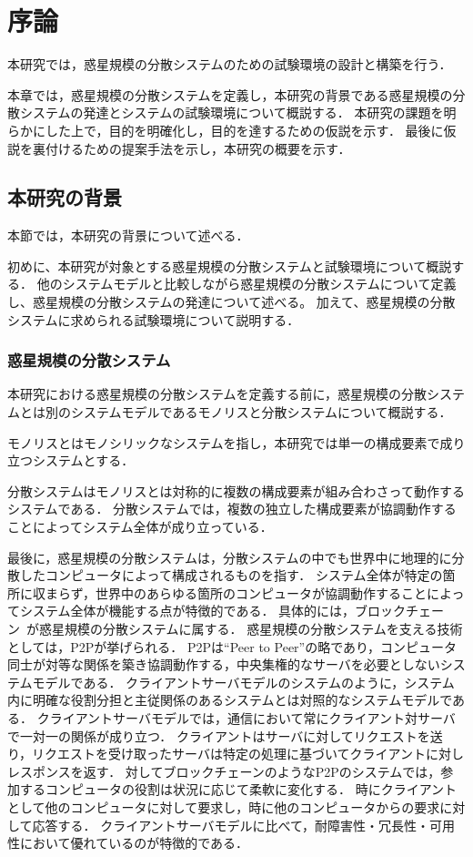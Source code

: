 \chapter{序論}
\label{introduction}

本研究では，惑星規模の分散システムのための試験環境の設計と構築を行う．

本章では，惑星規模の分散システムを定義し，本研究の背景である惑星規模の分散システムの発達とシステムの試験環境について概説する．
本研究の課題を明らかにした上で，目的を明確化し，目的を達するための仮説を示す．
最後に仮説を裏付けるための提案手法を示し，本研究の概要を示す．

\section{本研究の背景}
\label{introduction:background}

本節では，本研究の背景について述べる．

初めに、本研究が対象とする惑星規模の分散システムと試験環境について概説する．
他のシステムモデルと比較しながら惑星規模の分散システムについて定義し、惑星規模の分散システムの発達について述べる。
加えて、惑星規模の分散システムに求められる試験環境について説明する．

\subsection{惑星規模の分散システム}

本研究における惑星規模の分散システムを定義する前に，惑星規模の分散システムとは別のシステムモデルであるモノリスと分散システムについて概説する．

モノリスとはモノシリックなシステムを指し，本研究では単一の構成要素で成り立つシステムとする．

分散システムはモノリスとは対称的に複数の構成要素が組み合わさって動作するシステムである．
分散システムでは，複数の独立した構成要素が協調動作することによってシステム全体が成り立っている．

最後に，惑星規模の分散システムは，分散システムの中でも世界中に地理的に分散したコンピュータによって構成されるものを指す．
システム全体が特定の箇所に収まらず，世界中のあらゆる箇所のコンピュータが協調動作することによってシステム全体が機能する点が特徴的である．
具体的には，ブロックチェーン~\cite{Bitcoin}が惑星規模の分散システムに属する．
惑星規模の分散システムを支える技術としては，P2Pが挙げられる．
P2Pは``Peer to Peer''の略であり，コンピュータ同士が対等な関係を築き協調動作する，中央集権的なサーバを必要としないシステムモデルである．
クライアントサーバモデルのシステムのように，システム内に明確な役割分担と主従関係のあるシステムとは対照的なシステムモデルである．
クライアントサーバモデルでは，通信において常にクライアント対サーバで一対一の関係が成り立つ．
クライアントはサーバに対してリクエストを送り，リクエストを受け取ったサーバは特定の処理に基づいてクライアントに対しレスポンスを返す．
対してブロックチェーンのようなP2Pのシステムでは，参加するコンピュータの役割は状況に応じて柔軟に変化する．
時にクライアントとして他のコンピュータに対して要求し，時に他のコンピュータからの要求に対して応答する．
クライアントサーバモデルに比べて，耐障害性・冗長性・可用性において優れているのが特徴的である．

